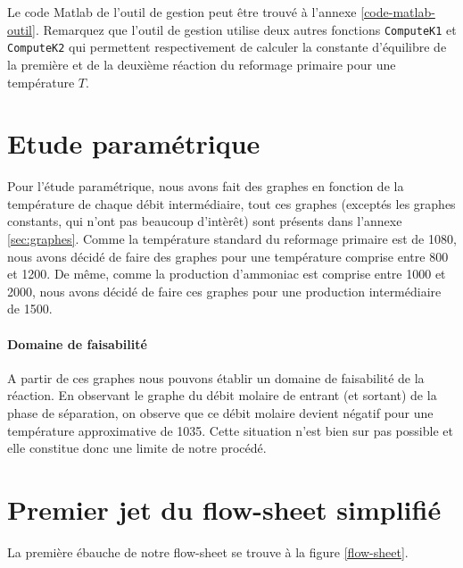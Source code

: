 Le code Matlab de l'outil de gestion peut être trouvé à l'annexe \ref{code-matlab-outil}.
Remarquez que l'outil de gestion utilise deux autres fonctions \lstinline{ComputeK1}
et \lstinline{ComputeK2} qui permettent respectivement de calculer la constante
d'équilibre de la première et de la deuxième réaction du reformage primaire pour
une température $T$.

\section{Etude paramétrique}
Pour l'étude paramétrique, nous avons fait des
graphes en fonction de la température de chaque
débit intermédiaire, tout ces graphes (exceptés
les graphes constants, qui n'ont pas beaucoup
d'intèrêt) sont présents dans l'annexe 
\ref{sec:graphes}. Comme la température
standard du reformage primaire est de 
\unit{1080}{\kelvin}, nous avons décidé
de faire des graphes pour une température
comprise entre 800 et \unit{1200}{\kelvin}.
De même, comme la production d'ammoniac
est comprise entre 1000 et \unit{2000}{\ton\per\dday},
nous avons décidé de faire ces graphes pour
une production intermédiaire de 
\unit{1500}{\ton\per\dday}.

\paragraph{Domaine de faisabilité}
A partir de ces graphes nous pouvons
établir un domaine de faisabilité de
la réaction. En observant le graphe
du débit molaire de  entrant
(et sortant) de la phase de séparation,
on observe que ce débit molaire
devient négatif pour une température
approximative de \unit{1035}{\kelvin}.
Cette situation n'est bien sur pas
possible et elle constitue donc une
limite de notre procédé.


\newpage
\annexe
\section{Premier jet du flow-sheet simplifié}
La première ébauche de notre flow-sheet se trouve à la figure \ref{flow-sheet}.

